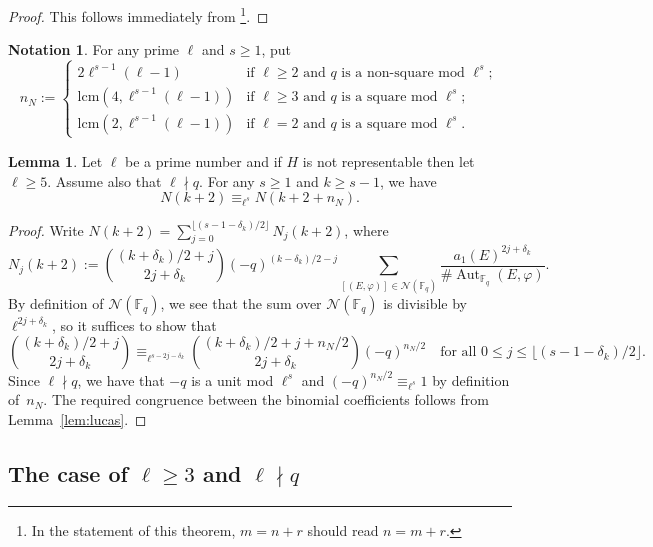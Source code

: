 \documentclass[10pt]{article}
\theoremstyle{definition}
\newtheorem{lemma}[theorem]{Lemma}
\newtheorem{notation}[theorem]{Notation}
\let\phi\varphi
\DeclareMathOperator\Aut{Aut}
\renewcommand{\:}{\colon}
\newcommand{\bF}{\mathbb{F}}
\newcommand{\F}{\mathbb{F}}
\begin{document}
\begin{proof}
    This follows immediately from \cite[Theorem~1]{prime-power-lucas}\footnote{In the statement of this theorem, $m = n + r$ should read $n = m+r$.}.
\end{proof}

\begin{notation} For any prime $\ell$ and $s \geq 1$, put 
    \[
     n_{N} := \begin{cases}
 2\ell^{s-1}(\ell-1) & \text{if } \ell \geq 2  \text{ and } q \text{ is a non-square mod }\ell^s; \\
    \text{lcm}(4,\ell^{s-1}(\ell-1)) & \text{if } \ell \geq 3  \text{ and } q \text{ is a square mod }\ell^s; \\  
     \text{lcm}(2,\ell^{s-1}(\ell-1)) & \text{if } \ell =2  \text{ and } q \text{ is a square mod }\ell^s.        
     \end{cases}
     \] 
\end{notation}

\begin{lemma} \label{lem:N_periodic}
Let $\ell$ be a prime number and if $H$ is not representable then let $\ell \geq 5$. Assume also that $\ell \nmid q$. 
    For any $s \geq 1$ and $k \geq s-1$, we have
    \[
    N(k+2) \equiv_{\ell^s} N(k+2+n_N).
    \]
\end{lemma}

\begin{proof} 
    Write $ N(k+2) = \sum_{j=0}^{\lfloor (s-1-\delta_k)/2\rfloor} N_j(k+2)$, where
   \[
    N_j(k+2) := 
    \binom{(k+\delta_k)/2+j}{2j+\delta_k} (-q)^{(k-\delta_k)/2 - j}  \sum_{[(E,\phi)] \in \mathcal N(\bF_q)}  \frac{a_1(E)^{2j+\delta_k}}{\# \Aut_{\F_q}(E,\phi)}.
    \]
    By definition of $\mathcal N(\mathbb F_q)$, we see that the sum over $\mathcal N(\mathbb F_q)$ is divisible by
    $\ell^{2j+\delta_k}$, so it suffices to show that 
    \[
     \binom{(k+\delta_k)/2+j}{2j+\delta_k} \equiv_{\ell^{s-2j-\delta_k}}  \binom{(k+\delta_k)/2+j+n_{N}/2}{2j+\delta_k}
     (-q)^{n_{N}/2} \quad \text{for all } 0 \leq j \leq \lfloor (s-1-\delta_k)/2\rfloor.
    \]
    Since $\ell \nmid q$, we have that $-q$ is a unit mod $\ell^{s}$ and $(-q)^{n_{N}/2}
    \equiv_{\ell^s} 1$ by definition of~$n_N$. The required congruence between the binomial coefficients follows from Lemma~\ref{lem:lucas}.
\end{proof}

\subsection{The case of $\ell \geq 3$ and $\ell \nmid q$}
\end{document}
